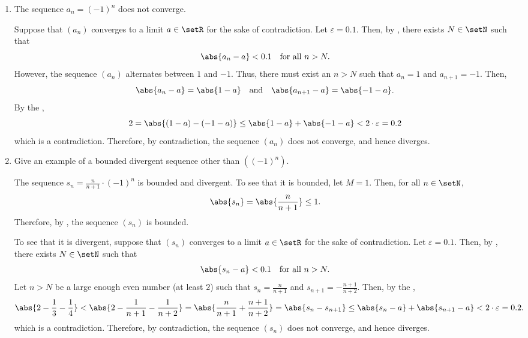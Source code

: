 \begin{enumerate}
\begin{enumerate}
    \item The sequence \(a_n=(-1)^n\) does not converge.
    \begin{subprove}
      Suppose that \((a_n)\) converges to a limit \(a \in \setR\) for the sake of contradiction.
      Let \(\varepsilon = 0.1\). Then,
      by , there exists \(N \in \setN\) such that
      \[
        \abs{a_n - a} < 0.1 \quad\text{for all } n > N.
      \]
      However, the sequence \((a_n)\) alternates between \(1\) and \(-1\).
      Thus, there must exist an \(n > N\) such that \(a_{n} = 1\) and \(a_{n+1} = -1\). Then,
      \[
        \abs{a_n - a} = \abs{1 - a} \quad\text{and}\quad \abs{a_{n+1} - a} = \abs{-1 - a}.
      \]
      By the ,
      \[
        2 = \abs{(1-a) - (-1-a)} \leq \abs{1 - a} + \abs{-1 - a} < 2 \cdot \varepsilon = 0.2
      \]
      which is a contradiction. Therefore, by contradiction, the sequence \((a_n)\) does not converge, and hence diverges.
    \end{subprove}



    \newpage
      
    \item Give an example of a bounded divergent sequence other than \(((-1)^n)\).
    \begin{subanswer}
      The sequence \(s_n = \frac{n}{n+1}\cdot (-1)^n\) is bounded and divergent.
      To see that it is bounded, let \(M = 1\). Then, for all \(n \in \setN\),
      \[
        \abs{s_n} = \abs{\frac{n}{n+1}} \leq 1.
      \]
      Therefore, by , the sequence \((s_n)\) is bounded.
      
      To see that it is divergent, suppose that \((s_n)\) converges to a limit \(a \in \setR\) for the sake of contradiction.
      Let \(\varepsilon = 0.1\). Then,
      by , there exists \(N \in \setN\) such that
      \[
        \abs{s_n - a} < 0.1 \quad\text{for all } n > N.
      \]
      Let \(n > N\) be a large enough even number (at least \(2\)) such that 
      \(s_{n} = \frac{n}{n+1}\) and \(s_{n+1} = -\frac{n+1}{n+2}\).
      Then, by the ,
      \[
        \abs{2 - \frac{1}{3} - \frac{1}{4}} < \abs{2 - \frac{1}{n+1} - \frac{1}{n+2}} = \abs{\frac{n}{n+1} + \frac{n+1}{n+2}}=\abs{s_n - s_{n+1}} \leq \abs{s_n - a} + \abs{s_{n+1} - a} < 2 \cdot \varepsilon = 0.2.
      \]
      which is a contradiction. Therefore, by contradiction, the sequence \((s_n)\) does not converge, and hence diverges.
    \end{subanswer}


\end{enumerate}
\end{enumerate}
